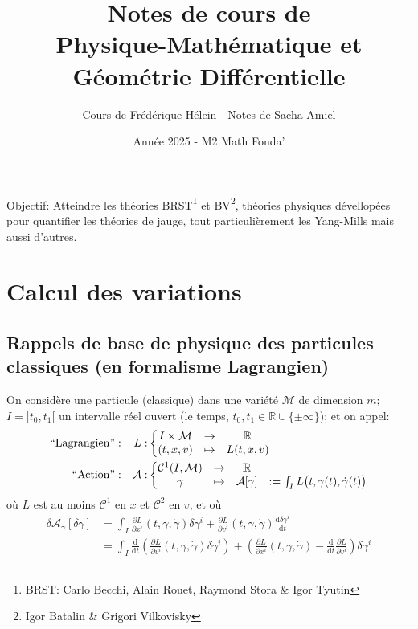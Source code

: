 \documentclass[a4paper,11pt]{article}
\renewcommand{\d}{{\mathrm{d}}}
\newcommand{\dr}[2]{\frac{\partial {#1}}{\partial{#2}}}
\begin{document}
\title{Notes de cours de\\Physique-Mathématique et Géométrie Différentielle}
\author{Cours de Frédérique Hélein - Notes de Sacha Amiel}
\date{Année 2025 - M2 Math Fonda'}
\maketitle
\tableofcontents
\newpage
\noindent\underline{Objectif}: Atteindre les théories BRST\footnote{BRST: Carlo Becchi, Alain Rouet, Raymond Stora \& Igor Tyutin} et BV\footnote{Igor Batalin \& Grigori Vilkovisky}, théories physiques dévellopées pour quantifier les théories de jauge, tout particulièrement les Yang-Mills mais aussi d'autres.

\section{Calcul des variations}
\subsection{Rappels de base de physique des particules classiques (en formalisme Lagrangien)}
\quad On considère une particule (classique) dans une variété $\mathcal{M}$ de dimension $m$; $I=]t_0,t_1[$ un intervalle réel ouvert (le temps, $t_0, t_1 \in \mathbb{R}\cup \{\pm \infty\}$); et on appel:
\begin{align*}
	``\mathrm{Lagrangien}":
		&&L:& \left\{\begin{matrix}
			I\times\mathcal{M} & \to & \mathbb{R}\\
			(t,x,v) & \mapsto & L(t,x,v)
		\end{matrix}\right.\\
	``\mathrm{Action}":  && \mathcal{A} :& \left\{\begin{matrix}
			\mathcal{C}^1(I,\mathcal{M}) & \to & \mathbb{R}&\\
			\gamma & \mapsto & \mathcal{A}[\gamma]&:=\int_I L\big(t,\gamma(t),\dot \gamma(t)\big)
		\end{matrix}\right.
\end{align*}
où $L$ est au moins $\mathcal{C}^1$ en $x$ et $\mathcal{C}^2$ en $v$, et où
\begin{equation*}\begin{split}
\delta\mathcal{A}_\gamma[\delta\gamma]
&=\int_I \dr{L}{x^i}(t,\gamma,\dot \gamma)\delta\gamma^i + \dr{L}{v^i}(t,\gamma, \dot \gamma)\frac{\d \delta \gamma^i}{\d t}\\
&=\int_I \frac{\d}{\d t}\left(\dr{L}{v^i}(t,\gamma,\dot \gamma)\delta\gamma^i \right)+ \left(\dr{L}{x^i}(t,\gamma, \dot \gamma) - \frac{\d}{\d t}\dr{L}{v^i}\right)\delta \gamma^i
\end{split}\end{equation*}
\end{document}
